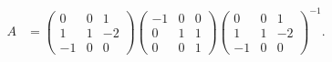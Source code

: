 \begin{exmp}
\begin{align*}
		\\
		A &=
		\begin{pmatrix}
			0 & 0 & 1 \\
			1 & 1 & -2 \\
			-1 & 0 & 0
		\end{pmatrix}
		\begin{pmatrix}
			-1 & 0 & 0 \\
			0 & 1 & 1 \\
			0 & 0 & 1
		\end{pmatrix}
		\begin{pmatrix}
			0 & 0 & 1 \\
			1 & 1 & -2 \\
			-1 & 0 & 0
		\end{pmatrix}^{-1}.
	\end{align*}
\end{exmp}

